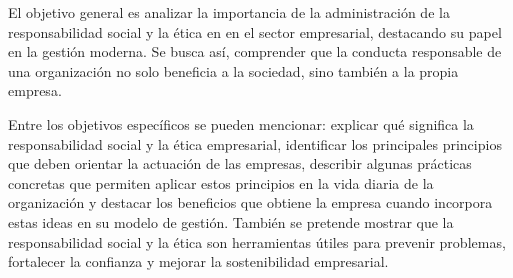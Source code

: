 El objetivo general es analizar la importancia de la administración de la responsabilidad social y la ética en en el sector empresarial, destacando su papel en la gestión moderna. Se busca así, comprender que la conducta responsable de una organización no solo beneficia a la sociedad, sino también a la propia empresa.

Entre los objetivos específicos se pueden mencionar: explicar qué significa la responsabilidad social y la ética empresarial, identificar los principales principios que deben orientar la actuación de las empresas, describir algunas prácticas concretas que permiten aplicar estos principios en la vida diaria de la organización y destacar los beneficios que obtiene la empresa cuando incorpora estas ideas en su modelo de gestión. También se pretende mostrar que la responsabilidad social y la ética son herramientas útiles para prevenir problemas, fortalecer la confianza y mejorar la sostenibilidad empresarial.
